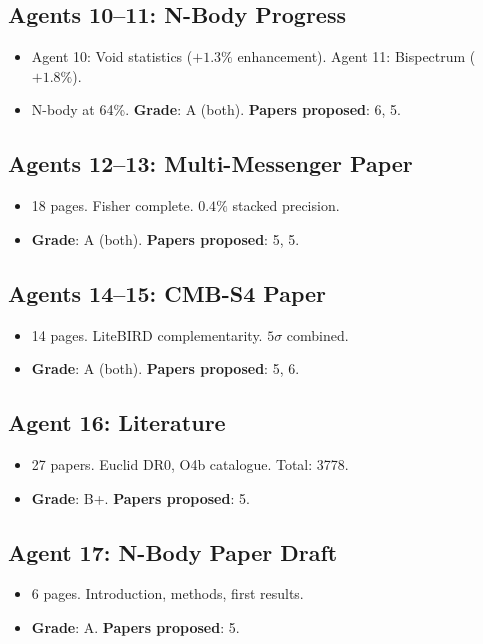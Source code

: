 \documentclass[11pt,a4paper]{article}
\begin{document}
\subsection{Agents 10--11: N-Body Progress}
\begin{itemize}[nosep]
\item Agent 10: Void statistics ($+1.3\%$ enhancement). Agent 11: Bispectrum ($+1.8\%$).
\item N-body at 64\%. \textbf{Grade}: A (both). \textbf{Papers proposed}: 6, 5.
\end{itemize}

\subsection{Agents 12--13: Multi-Messenger Paper}
\begin{itemize}[nosep]
\item 18 pages. Fisher complete. $0.4\%$ stacked precision.
\item \textbf{Grade}: A (both). \textbf{Papers proposed}: 5, 5.
\end{itemize}

\subsection{Agents 14--15: CMB-S4 Paper}
\begin{itemize}[nosep]
\item 14 pages. LiteBIRD complementarity. $5\sigma$ combined.
\item \textbf{Grade}: A (both). \textbf{Papers proposed}: 5, 6.
\end{itemize}

\subsection{Agent 16: Literature}
\begin{itemize}[nosep]
\item 27 papers. Euclid DR0, O4b catalogue. Total: 3778.
\item \textbf{Grade}: B+. \textbf{Papers proposed}: 5.
\end{itemize}

\subsection{Agent 17: N-Body Paper Draft}
\begin{itemize}[nosep]
\item 6 pages. Introduction, methods, first results.
\item \textbf{Grade}: A. \textbf{Papers proposed}: 5.
\end{itemize}
\end{document}
